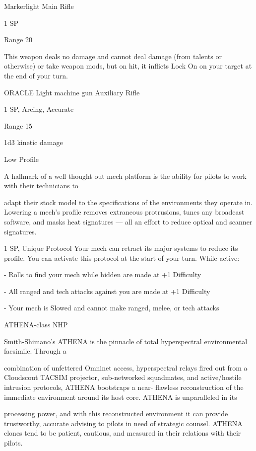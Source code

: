 Markerlight  
Main Rifle
 
1 SP
 
Range 20
 

This weapon deals no damage and cannot deal damage (from talents or otherwise) or take  
weapon mods, but on hit, it inflicts Lock On on your target at the end of your turn.
 

ORACLE Light machine gun  
Auxiliary Rifle
 
1 SP, Arcing, Accurate
 
Range 15
 
1d3 kinetic damage
 

Low Profile  

A hallmark of a well thought out mech platform is the ability for pilots to work with their technicians to  

adapt their stock model to the specifications of the environments they operate in. Lowering a mech’s profile  
removes extraneous protrusions, tunes any broadcast software, and masks heat signatures — all an effort  
to reduce optical and scanner signatures.   

1 SP, Unique  
Protocol  
Your mech can retract its major systems to reduce its profile. You can activate this protocol at  
the start of your turn. While active:
 
     -   Rolls to find your mech while hidden are made at +1 Difficulty
 
     -   All ranged and tech attacks against you are made at +1 Difficulty
 
     -   Your mech is Slowed and cannot make ranged, melee, or tech attacks
 

ATHENA-class NHP  

Smith-Shimano’s ATHENA is the pinnacle of total hyperspectral environmental facsimile. Through a  

combination of unfettered Omninet access, hyperspectral relays fired out from a Cloudscout TACSIM  
projector, sub-networked squadmates, and active/hostile intrusion protocols, ATHENA bootstraps a near- 
flawless reconstruction of the immediate environment around its host core. ATHENA is unparalleled in its  

processing power, and with this reconstructed environment it can provide trustworthy, accurate advising to  
pilots in need of strategic counsel.   
ATHENA clones tend to be patient, cautious, and measured in their relations with their pilots.  

                                                                                                               


